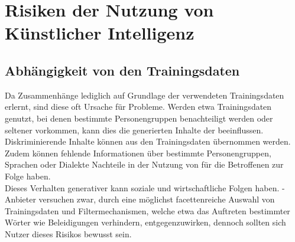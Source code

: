 \documentclass[../main.tex]{subfiles}
\begin{document}
\section{Risiken der Nutzung von Künstlicher Intelligenz}

\subsection{Abhängigkeit von den Trainingsdaten}

Da  Zusammenhänge lediglich auf Grundlage der verwendeten Trainingsdaten erlernt, sind diese oft Ursache für Probleme. Werden etwa Trainingsdaten genutzt, 
bei denen bestimmte Personengruppen benachteiligt werden oder seltener vorkommen, kann dies die generierten Inhalte der  beeinflussen. Diskriminierende Inhalte können aus den Trainingsdaten 
übernommen werden. Zudem können fehlende Informationen über bestimmte Personengruppen, Sprachen oder Dialekte Nachteile in der Nutzung von  für die Betroffenen zur Folge haben.\\ 
Dieses Verhalten generativer  kann soziale und wirtschaftliche Folgen haben. -Anbieter versuchen zwar, durch eine möglichst 
facettenreiche Auswahl von Trainingsdaten und Filtermechanismen, welche etwa das Auftreten bestimmter Wörter wie Beleidigungen verhindern, entgegenzuwirken, 
dennoch sollten sich Nutzer dieses Risikos bewusst sein.\\
\end{document}
